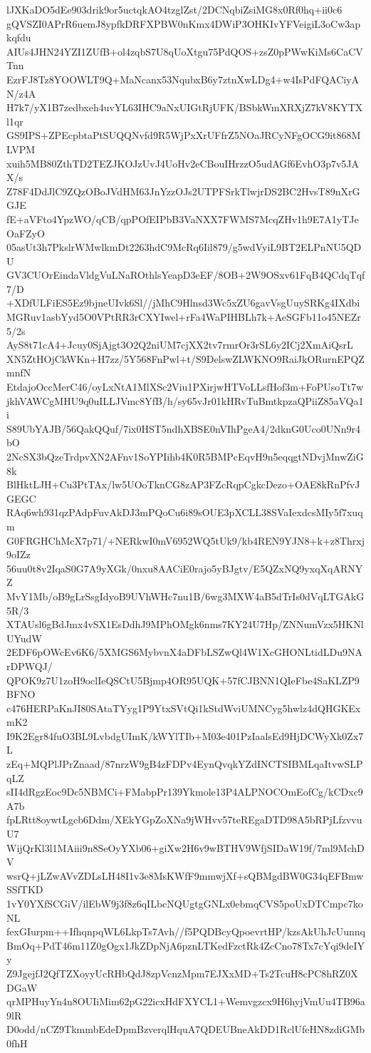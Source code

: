 lJXKaDO5dEe903drik9or5uctqkAO4tzglZst/2DCNqbiZsiMG8x0Rf0hq+ii0c6
gQVSZI0APrR6uemJ8ypfkDRFXPBW0nKmx4DWiP3OHKIvYFVeigiL3oCw3apkqfdu
AIUs4JHN24YZI1ZUfB+ol4zqbS7U8qUoXtgu75PdQOS+zsZ0pPWwKiMs6CaCVTnn
EzrFJ8Tz8YOOWLT9Q+MaNcanx53NqubxB6y7ztnXwLDg4+w4IsPdFQACiyAN/z4A
H7k7/yX1B7zedbxeh4uvYL63IHC9aNxUIGtRjUFK/BSbkWmXRXjZ7kV8KYTXl1qr
GS9IPS+ZPEcpbtaPtSUQQNvfd9R5WjPxXrUFfrZ5NOaJRCyNFgOCG9it868MLVPM
xuih5MB80ZthTD2TEZJKOJzUvJ4UoHv2eCBouIHrzzO5udAGf6EvhO3p7v5JAX/s
Z78F4DdJlC9ZQzOBoJVdHM63JnYzzOJs2UTPFSrkTlwjrDS2BC2HvsT89nXrGGJE
fE+aVFto4YpzWO/qCB/qpPOfEIPbB3VaNXX7FWMS7McqZHv1h9E7A1yTJeOaFZyO
05asUt3h7PkslrWMwlkmDt2263hdC9McRq6Iil879/g5wdVyiL9BT2ELPnNU5QDU
GV3CUOrEindaVldgVuLNaROthlsYeapD3eEF/8OB+2W9OSxv61FqB4QCdqTqf7/D
+XDfULFiES5Ez9bjneUIvk6Sl//jMhC9Hlnsd3Wc5xZU6gavVsgUuySRKg4IXdbi
MGRuv1asbYyd5O0VPtRR3rCXYIwel+rFa4WaPIHBLh7k+AeSGFb11o45NEZr5/2s
AyS8t71cA4+Jcuy0SjAjgt3O2Q2niUM7cjXX2tv7rmrOr3rSL6y2ICj2XmAiQsrL
XN5ZtHOjCkWKn+H7zz/5Y568FnPwl+t/S9DelswZLWKNO9RaiJkORurnEPQZmnfN
EtdajoOccMerC46/oyLxNtA1MlXSc2Viu1PXirjwHTVoLLsfHof3m+FoPUsoTt7w
jkhVAWCgMHU9q0uILLJVmc8YfB/h/sy65vJr01kHRvTuBmtkpzaQPiiZ85aVQa1i
S89UbYAJB/56QakQQuf/7ix0HST5ndhXBSE0nVIhPgeA4/2dknG0Uco0UNn9r4bO
2NcSX3bQzeTrdpvXN2AFnv1SoYPIihb4K0R5BMPcEqvH9n5eqqgtNDvjMnwZiG8k
BlHktLJH+Cu3PtTAx/lw5UOoTknCG8zAP3FZcRqpCgkcDezo+OAE8kRnPfvJGEGC
RAq6wh931qzPAdpFuvAkDJ3mPQoCu6i89sOUE3pXCLL38SVaIexdcsMIy5f7xuqm
G0FRGHChMcX7p71/+NERkwI0mV6952WQ5tUk9/kb4REN9YJN8+k+z8Thrxj9oIZz
56uu0t8v2IqaS0G7A9yXGk/0nxu8AACiE0rajo5yBJgtv/E5QZxNQ9yxqXqARNYZ
MvY1Mb/oB9gLrSsgIdyoB9UVhWHc7nu1B/6wg3MXW4aB5dTrIs0dVqLTGAkG5R/3
XTAUsl6gBdJmx4vSX1EsDdhJ9MPhOMgk6nms7KY24U7Hp/ZNNumVzx5HKNlUYudW
2EDF6pOWcEv6K6/5XMGS6MybvnX4aDFbLSZwQl4W1XcGHONLtidLDu9NArDPWQJ/
QPOK9z7U1zoH9oclIeQSCtU5Bjmp4OR95UQK+57fCJBNN1QIeFbe4SaKLZP9BFNO
c476HERPaKnJI80SAtaTYyg1P9YtxSVtQi1kStdWviUMNCyg5hwlz4dQHGKExmK2
I9K2Egr84fuO3BL9LvbdgUImK/kWYlTIb+M03e401PzIaalsEd9HjDCWyXk0Zx7L
zEq+MQPlJPrZnaad/87nrzW9gB4zFDPv4EynQvqkYZdINCTSIBMLqaItvwSLPqLZ
sII4dRgzEoc9Dc5NBMCi+FMabpPr139Ykmole13P4ALPNOCOmEofCg/kCDxc9A7b
fpLRtt8oywtLgcb6Ddm/XEkYGpZoXNa9jWHvv57teREgaDTD98A5bRPjLfzvvuU7
WijQrKl3l1MAiii9n8SeOyYXb06+giXw2H6v9wBTHV9WfjSIDaW19f/7ml9MchDV
wsrQ+jLZwAVvZDLsLH48I1v3e8MsKWfF9mmwjXf+sQBMgdBW0G34qEFBmwSSfTKD
1vY0YXfSCGiV/ilEbW9j3f8z6qILbcNQUgtgGNLx0ebmqCVS5poUxDTCmpc7koNL
fexGIurpm++IfhqnpqWL6LkpTs7Avh//f5PQDBcyQpoevrtHP/kzsAkUhJcUunnq
BmOq+PdT46m11Z0gOgx1JkZDpNjA6pznLTKedFzctRk4ZcCno78Tx7cYqi9deIYy
Z9JgejfJ2QfTZXoyyUcRHbQdJ8zpVcnzMpm7EJXxMD+Ts2TcuH8cPC8hRZ0XDGaW
qrMPHuyYn4n8OUIiMim62pG22icxHdFXYCL1+Wemvgzcx9H6hyjVmUu4TB96a9lR
D0odd/nCZ9TkmmbEdeDpmBzverqlHquA7QDEUBneAkDD1RclUfeHN8zdiGMb0fhH
